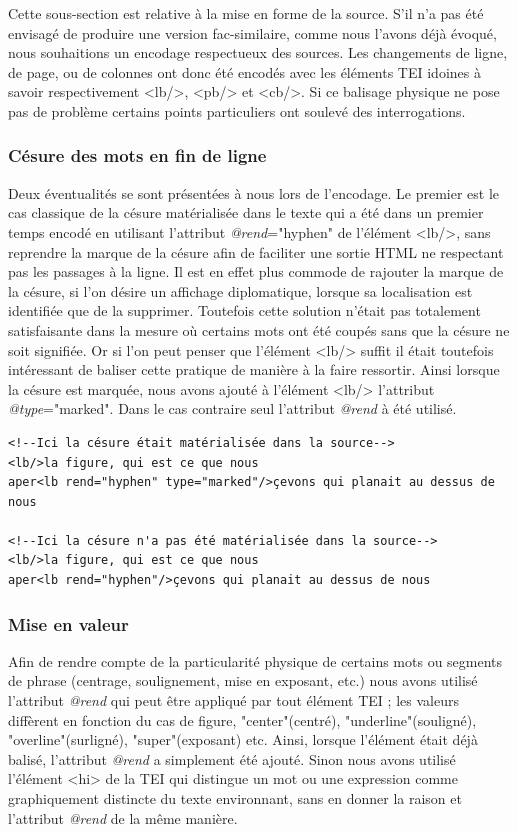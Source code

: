 \documentclass[12pt,a4paper]{book} %
\begin{document}
Cette sous-section est relative à la mise en forme de la source. S'il n'a pas été envisagé de produire une version fac-similaire, comme nous l'avons déjà évoqué, nous souhaitions un encodage respectueux des sources.
Les changements de ligne, de page, ou de colonnes ont donc été encodés avec les éléments TEI idoines à savoir respectivement <lb/>, <pb/> et <cb/>. Si ce balisage physique ne pose pas de problème certains points particuliers ont soulevé des interrogations.

\subsubsection{Césure des mots en fin de ligne} 

Deux éventualités se sont présentées à nous lors de l'encodage. Le premier est le cas classique de la césure matérialisée dans le texte qui a été dans un premier temps encodé en utilisant l'attribut \textit{@rend}="hyphen" de l'élément <lb/>, sans reprendre la marque de la césure afin de faciliter une sortie HTML ne respectant pas les passages à la ligne. Il est en effet plus commode de rajouter la marque de la césure, si l'on désire un affichage diplomatique, lorsque sa localisation est identifiée que de la supprimer. Toutefois cette solution n'était pas totalement satisfaisante dans la mesure où certains mots ont été coupés sans que la césure ne soit signifiée. Or si l'on peut penser que l'élément <lb/> suffit il était toutefois intéressant de baliser cette pratique de manière à la faire ressortir. Ainsi lorsque la césure est marquée, nous avons ajouté à l'élément <lb/> l'attribut \textit{@type}="marked". Dans le cas contraire seul l'attribut \textit{@rend} à été utilisé.
\bigskip

\begin{lstlisting}
<!--Ici la césure était matérialisée dans la source-->
<lb/>la figure, qui est ce que nous 
aper<lb rend="hyphen" type="marked"/>çevons qui planait au dessus de nous

<!--Ici la césure n'a pas été matérialisée dans la source-->
<lb/>la figure, qui est ce que nous 
aper<lb rend="hyphen"/>çevons qui planait au dessus de nous
\end{lstlisting} 
\bigskip

\subsubsection{Mise en valeur}

Afin de rendre compte de la particularité physique de certains mots ou segments de phrase (centrage, soulignement, mise en exposant, etc.) nous avons utilisé l'attribut \textit{@rend} qui peut être appliqué par tout élément TEI ; les valeurs diffèrent en fonction du cas de figure, "center"(centré), "underline"(souligné), "overline"(surligné), "super"(exposant) etc.
Ainsi, lorsque l'élément était déjà balisé, l'attribut \textit{@rend} a simplement été ajouté. Sinon nous avons utilisé l'élément <hi> de la TEI qui \og distingue un mot ou une expression comme graphiquement distincte du texte environnant, sans en donner la raison \fg{} et l'attribut \textit{@rend} de la même manière.
\bigskip
\end{document}
